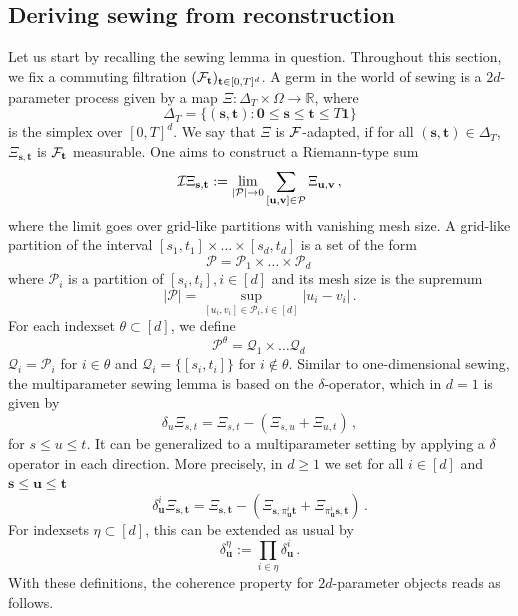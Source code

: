 \documentclass[12pt]{article}
\numberwithin{equation}{section}
\theoremstyle{plain}
\theoremstyle{definition}
\newcommand{\abs}[1]{\left\vert #1 \right\vert}
\def\cP{\mathcal{P}}\def\cQ{\mathcal{Q}}
\def\bR{\mathbb{R}}\def\bS{\mathbb{S}}
\def\fs{\mathbf s}\def\ft{\mathbf t}
\def\fu{\mathbf u}\def\fv{\mathbf v}
\def\foo{{\boldsymbol 0}}
\def\fone{{\boldsymbol 1}}
\begin{document}
\subsection{Deriving  sewing from  reconstruction}

Let us start by recalling the sewing lemma in question. Throughout this section, we fix a commuting filtration $(\cF_\ft)_{\ft\in[0,T]^d}$. A germ in the world of sewing is a $2d$-parameter process given by a map $\Xi:\Delta_T\times\Omega\to\bR$, where
\[
    \Delta_T = \{(\fs,\ft)\colon \foo\le\fs\le\ft\le T\fone\}
\]
is the simplex over $[0,T]^d$. We say that $\Xi$ is $\mathcal{F}$-adapted, if for all $(\fs,\ft)\in\Delta_T$, $\Xi_{\fs,\ft}$ is $\cF_\ft$ measurable. One aims to construct a Riemann-type sum
\begin{equation}\label{eq:limitSewing}
    \cI\Xi_{\fs,\ft} := \lim_{\abs{\cP}\to 0} \sum_{[\fu,\fv]\in\cP} \Xi_{\fu,\fv}\,,
\end{equation}
where the limit goes over grid-like partitions with vanishing mesh size. A grid-like partition of the interval $[s_1,t_1]\times\dots\times[s_d,t_d]$ is a set of the form 
\[
\cP = \cP_1 \times\dots\times\cP_d\,
\]
where $\cP_i$ is a partition of $[s_i,t_i], i\in[d]$ and its mesh size is the supremum
\[
    \abs{\cP} = \sup_{[u_i,v_i]\in\cP_i, i\in[d]}\abs{u_i-v_i}\,.
\]
For each indexset $\theta\subset[d]$, we define 
\[
\cP^\theta = \cQ_1\times\dots\cQ_d\,
\]
$\cQ_i = \cP_i$ for $i\in\theta$ and $\cQ_i = \{[s_i,t_i]\}$ for $i\notin\theta$. Similar to one-dimensional sewing, the multiparameter sewing lemma is based on the $\delta$-operator, which in $d = 1$ is given by
\begin{equation*}
    \delta_u \Xi_{s,t} = \Xi_{s,t}-(\Xi_{s,u}+\Xi_{u,t})\,,
\end{equation*}
for $s\le u\le t$. It can be generalized to a multiparameter setting by applying a $\delta$ operator in each direction. More precisely, in $d\ge1$ we set for all $i\in[d]$ and $\fs\le\fu\le\ft$
\[
\delta^i_\fu \Xi_{\fs,\ft} = \Xi_{\fs,\ft} - (\Xi_{\fs,\pi^i_\fu \ft} + \Xi_{\pi^i_\fu\fs,\ft})\,.
\]
For indexsets $\eta\subset[d]$, this can be extended as usual by
\[
    \delta_\fu^\eta :=\prod_{i\in\eta} \delta^i_\fu\,.
\]
With these definitions, the coherence property for $2d$-parameter objects reads as follows.
\end{document}
